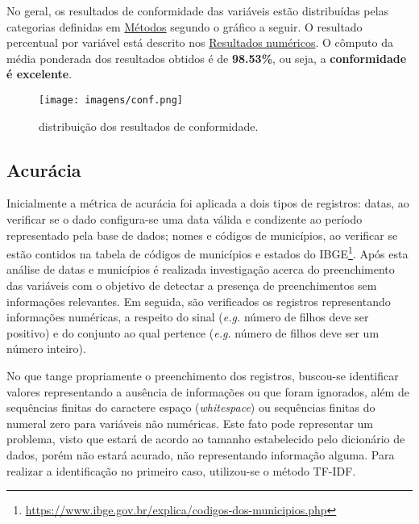 \documentclass[
  12,
  table]{proadi}
\begin{document}
No geral, os resultados de conformidade das variáveis estão distribuídas
pelas categorias definidas em \protect\hyperlink{muxe9todos}{Métodos}
segundo o gráfico a seguir. O resultado percentual por variável está
descrito nos \protect\hyperlink{resultados-numuxe9ricos}{Resultados
numéricos}. O cômputo da média ponderada dos resultados obtidos é de
\textbf{98.53\%}, ou seja, a \textbf{conformidade é excelente}.

\begin{figure}
\centering
\texttt{[image: imagens/conf.png]}
\caption{distribuição dos resultados de conformidade.}
\end{figure}

\hypertarget{acuruxe1cia}{%
\subsection{Acurácia}\label{acuruxe1cia}}

Inicialmente a métrica de acurácia foi aplicada a dois tipos de
registros: datas, ao verificar se o dado configura-se uma data válida e
condizente ao período representado pela base de dados; nomes e códigos
de municípios, ao verificar se estão contidos na tabela de códigos de
municípios e estados do IBGE\footnote{\url{https://www.ibge.gov.br/explica/codigos-dos-municipios.php}}.
Após esta análise de datas e municípios é realizada investigação acerca
do preenchimento das variáveis com o objetivo de detectar a presença de
preenchimentos sem informações relevantes. Em seguida, são verificados
os registros representando informações numéricas, a respeito do sinal
(\emph{e.g.} número de filhos deve ser positivo) e do conjunto ao qual
pertence (\emph{e.g.} número de filhos deve ser um número inteiro).

No que tange propriamente o preenchimento dos registros, buscou-se
identificar valores representando a ausência de informações ou que foram
ignorados, além de sequências finitas do caractere espaço
(\emph{whitespace}) ou sequências finitas do numeral zero para variáveis
não numéricas. Este fato pode representar um problema, visto que estará
de acordo ao tamanho estabelecido pelo dicionário de dados, porém não
estará acurado, não representando informação alguma. Para realizar a
identificação no primeiro caso, utilizou-se o método TF-IDF.
\end{document}
